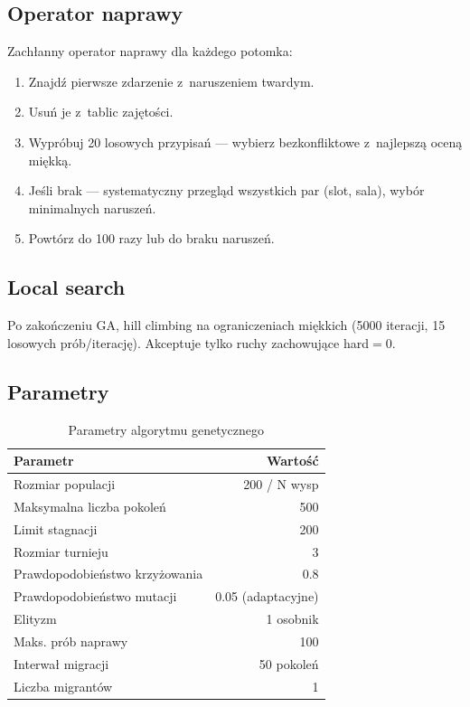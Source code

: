 \documentclass{common/sprawozdanie-agh}
\begin{document}
\subsection{Operator naprawy}

Zachłanny operator naprawy dla każdego potomka:
\begin{enumerate}
    \item Znajdź pierwsze zdarzenie z~naruszeniem twardym.
    \item Usuń je z~tablic zajętości.
    \item Wypróbuj 20 losowych przypisań --- wybierz bezkonfliktowe z~najlepszą oceną miękką.
    \item Jeśli brak --- systematyczny przegląd wszystkich par (slot, sala), wybór minimalnych naruszeń.
    \item Powtórz do 100 razy lub do braku naruszeń.
\end{enumerate}

\subsection{Local search}

Po zakończeniu GA, hill climbing na ograniczeniach miękkich (5000 iteracji, 15 losowych prób/iterację). Akceptuje tylko ruchy zachowujące hard$=$0.

\subsection{Parametry}

\begin{table}[H]
\centering
\begin{tabular}{lr}
\toprule
\textbf{Parametr} & \textbf{Wartość} \\
\midrule
Rozmiar populacji               & 200 / N wysp \\
Maksymalna liczba pokoleń       & 500 \\
Limit stagnacji                 & 200 \\
Rozmiar turnieju                & 3 \\
Prawdopodobieństwo krzyżowania  & 0.8 \\
Prawdopodobieństwo mutacji      & 0.05 (adaptacyjne) \\
Elityzm                         & 1 osobnik \\
Maks. prób naprawy              & 100 \\
Interwał migracji               & 50 pokoleń \\
Liczba migrantów                & 1 \\
\bottomrule
\end{tabular}
\caption{Parametry algorytmu genetycznego}
\label{tab:params}
\end{table}
\end{document}
